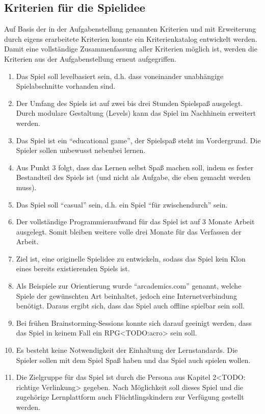 \subsection{Kriterien für die Spielidee}\label{ssec:kriterien}
	Auf Basis der in der Aufgabenstellung genannten Kriterien und mit Erweiterung durch eigens erarbeitete Kriterien konnte ein Kriterienkatalog entwickelt werden. Damit eine vollständige Zusammenfassung aller Kriterien möglich ist, werden die Kriterien aus der Aufgabenstellung erneut aufgegriffen.
\begin{enumerate}
	\item{Das Spiel soll levelbasiert sein, d.h. dass voneinander unabhängige Spielabschnitte vorhanden sind.}
	\item{Der Umfang des Spiels ist auf zwei bis drei Stunden Spielspaß ausgelegt. Durch modulare Gestaltung (Levels) kann das Spiel im Nachhinein erweitert werden.}
	\item{Das Spiel ist ein \enquote{educational game}, der Spielspaß steht im Vordergrund. Die Spieler sollen unbewusst nebenbei lernen.}
	\item{Aus Punkt 3 folgt, dass das Lernen selbst Spaß machen soll, indem es fester Bestandteil des Spiels ist (und nicht als Aufgabe, die eben gemacht werden muss).}
	\item{Das Spiel soll \enquote{casual} sein, d.h. ein Spiel \enquote{für zwischendurch} sein.}
	\item{Der vollständige Programmieraufwand für das Spiel ist auf 3 Monate Arbeit ausgelegt. Somit bleiben weitere volle drei Monate für das Verfassen der Arbeit.}
	\item{Ziel ist, eine originelle Spielidee zu entwickeln, sodass das Spiel kein Klon eines bereits existierenden Spiels ist.}
	\item{Als Beispiele zur Orientierung wurde \enquote{arcademics.com} genannt, welche Spiele der gewünschten Art beinhaltet, jedoch eine Internetverbindung benötigt. Daraus ergibt sich, dass das Spiel auch offline spielbar sein soll.}
	\item{Bei frühen Brainstorming-Sessions konnte sich darauf geeinigt werden, dass das Spiel in keinem Fall ein RPG<TODO:acro> sein soll.}
	\item{Es besteht keine Notwendigkeit der Einhaltung der Lernstandards. Die Spieler sollen mit dem Spiel Spaß haben und das Spiel auch spielen wollen.}
	\item{Die Zielgruppe für das Spiel ist durch die Persona aus Kapitel 2<TODO: richtige Verlinkung> gegeben. Nach Möglichkeit soll dieses Spiel und die zugehörige Lernplattform auch Flüchtlingskindern zur Verfügung gestellt werden.}
\end{enumerate}

